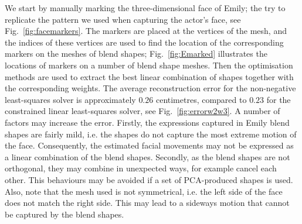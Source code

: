 \documentclass[11pt]{report}
\begin{document}
We start by manually marking the three-dimensional face of Emily; the try to replicate the pattern we used when capturing the actor's face, see Fig.~\ref{fig:facemarkers}. The markers are placed at the vertices of the mesh, and the indices of these vertices are used to find the location of the corresponding markers on the meshes of blend shapes; Fig.~\ref{fig:Emarked} illustrates the locations of markers on a number of blend shape meshes. Then the optimisation methods are used to extract the best linear combination of shapes together with the corresponding weights. The average reconstruction error for the non-negative least-squares solver is approximately $0.26$ centimetres, compared to $0.23$ for the constrained linear least-squares solver, see Fig.~\ref{fig:errorw2w3}. A number of factors may increase the error. Firstly, the expressions captured in Emily blend shapes are fairly mild, i.e. the shapes do not capture the most extreme motion of the face. Consequently, the estimated facial movements may not be expressed as a linear combination of the blend shapes. Secondly, as the blend shapes are not orthogonal, they may combine in unexpected ways, for example cancel each other. This behaviours may be avoided if a set of PCA-produced shapes is used. Also, note that the mesh used is not symmetrical, i.e. the left side of the face does not match the right side. This may lead to a sideways motion that cannot be captured by the blend shapes.
\end{document}
